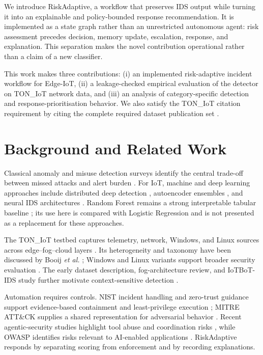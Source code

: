 \documentclass[conference]{IEEEtran}
\begin{document}
We introduce RiskAdaptive, a workflow that preserves IDS output while turning it into an explainable and policy-bounded response recommendation. It is implemented as a state graph rather than an unrestricted autonomous agent: risk assessment precedes decision, memory update, escalation, response, and explanation. This separation makes the novel contribution operational rather than a claim of a new classifier.

This work makes three contributions: (i) an implemented risk-adaptive incident workflow for Edge-IoT, (ii) a leakage-checked empirical evaluation of the detector on TON\_IoT network data, and (iii) an analysis of category-specific detection and response-prioritisation behavior. We also satisfy the TON\_IoT citation requirement by citing the complete required dataset publication set \cite{moustafa2021,booij2021,alsaedi2020,moustafaWindows2020,moustafaLinux2020,moustafa2019data,moustafa2019fog,ashraf2021}.

\section{Background and Related Work}
Classical anomaly and misuse detection surveys identify the central trade-off between missed attacks and alert burden \cite{ahmed2016,khraisat2019}. For IoT, machine and deep learning approaches include distributed deep detection \cite{diro2018}, autoencoder ensembles \cite{mirsky2018}, and neural IDS architectures \cite{shone2018,vinayakumar2019}. Random Forest remains a strong interpretable tabular baseline \cite{breiman2001}; its use here is compared with Logistic Regression and is not presented as a replacement for these approaches.

The TON\_IoT testbed captures telemetry, network, Windows, and Linux sources across edge--fog--cloud layers \cite{moustafa2021,alsaedi2020}. Its heterogeneity and taxonomy have been discussed by Booij \textit{et al.} \cite{booij2021}; Windows and Linux variants support broader security evaluation \cite{moustafaWindows2020,moustafaLinux2020}. The early dataset description, fog-architecture review, and IoTBoT-IDS study further motivate context-sensitive detection \cite{moustafa2019data,moustafa2019fog,ashraf2021}.

Automation requires controls. NIST incident handling and zero-trust guidance support evidence-based containment and least-privilege execution \cite{nist61,nist207}; MITRE ATT\&CK supplies a shared representation for adversarial behavior \cite{mitre}. Recent agentic-security studies highlight tool abuse and coordination risks \cite{chhabra2025,schroeder2025}, while OWASP identifies risks relevant to AI-enabled applications \cite{owasp2025}. RiskAdaptive responds by separating scoring from enforcement and by recording explanations.
\end{document}
